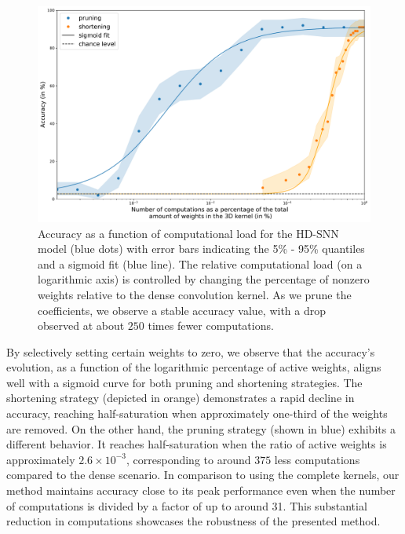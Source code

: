 \documentclass[default]{sn-jnl}%
\theoremstyle{thmstyleone}%
\theoremstyle{thmstyletwo}%
\theoremstyle{thmstylethree}%
\begin{document}
\begin{figure}%
    \centering
    \includegraphics[width=0.95\linewidth]{figures/quant_accuracy.pdf}
    \caption{
        Accuracy as a function of computational load for the HD-SNN model (blue dots) with error bars indicating the 5\% - 95\% quantiles and a sigmoid fit (blue line). The relative computational load (on a logarithmic axis) is controlled by changing the percentage of nonzero weights relative to the dense convolution kernel. As we prune the coefficients, we observe a stable accuracy value, with a drop observed at about $250$ times fewer computations.
        }
    \label{fig:accuracy}
\end{figure}
%
By selectively setting certain weights to zero, we observe that the accuracy's evolution, as a function of the logarithmic percentage of active weights, aligns well with a sigmoid curve for both pruning and shortening strategies. The shortening strategy (depicted in orange) demonstrates a rapid decline in accuracy, reaching half-saturation when approximately one-third of the weights are removed. On the other hand, the pruning strategy (shown in blue) exhibits a different behavior. It reaches half-saturation when the ratio of active weights is approximately $2.6\times 10^{-3}$, corresponding to around $375$ less computations compared to the dense scenario. In comparison to using the complete kernels, our method maintains accuracy close to its peak performance even when the number of computations is divided by a factor of up to around 31. This substantial reduction in computations showcases the robustness of the presented method.
%
%
%
\end{document}
